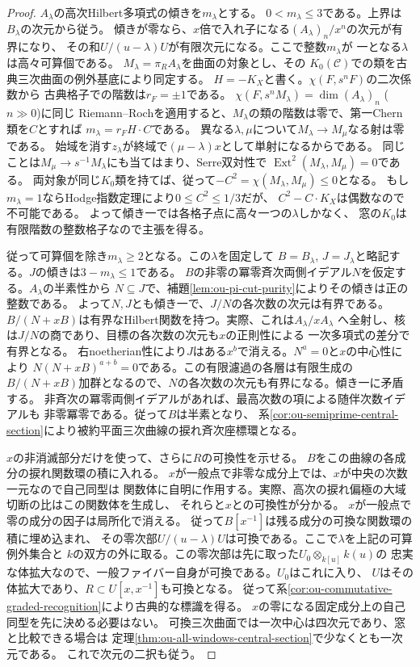 \documentclass[11pt,a4paper]{ltjsarticle}
\theoremstyle{definition}
\begin{document}
\begin{proof}
$A_\lambda$の高次Hilbert多項式の傾きを$m_\lambda$とする。
$0<m_\lambda\le3$である。上界は$B_\lambda$の次元から従う。
傾きが零なら、$x$倍で入れ子になる$(A_\lambda)_n/x^n$の次元が有界になり、
その和$U/(u-\lambda)U$が有限次元になる。ここで整数$m_\lambda$が
一となる$\lambda$は高々可算個である。
$M_\lambda=\pi_R A_\lambda$を曲面の対象とし、その
$K_0(\mathcal C)$での類を古典三次曲面の例外基底により同定する。
$H=-K_X$と書く。$\chi(F,s^nF)$の二次係数から
古典格子での階数は$r_F=\pm1$である。
$\chi(F,s^nM_\lambda)=\dim(A_\lambda)_n$ ($n\gg0$)に同じ
Riemann--Rochを適用すると、$M_\lambda$の類の階数は零で、第一Chern類を$C$とすれば
$m_\lambda=r_F H\cdot C$である。
異なる$\lambda,\mu$について$M_\lambda\to M_\mu$なる射は零である。
始域を消す$z_\lambda$が終域で$(\mu-\lambda)x$として単射になるからである。
同じことは$M_\mu\to s^{-1}M_\lambda$にも当てはまり、Serre双対性で
$\operatorname{Ext}^2(M_\lambda,M_\mu)=0$である。
両対象が同じ$K_0$類を持てば、従って$-C^2=\chi(M_\lambda,M_\mu)\le0$となる。
もし$m_\lambda=1$ならHodge指数定理により$0\le C^2\le1/3$だが、
$C^2-C\cdot K_X$は偶数なので不可能である。
よって傾き一では各格子点に高々一つの$\lambda$しかなく、
窓の$K_0$は有限階数の整数格子なので主張を得る。

従って可算個を除き$m_\lambda\ge2$となる。この$\lambda$を固定して
$B=B_\lambda$, $J=J_\lambda$と略記する。$J$の傾きは$3-m_\lambda\le1$である。
$B$の非零の冪零斉次両側イデアル$N$を仮定する。$A_\lambda$の半素性から
$N\subseteq J$で、補題\ref{lem:ou-pi-cut-purity}によりその傾きは正の整数である。
よって$N,J$とも傾き一で、$J/N$の各次数の次元は有界である。
$B/(N+xB)$は有界なHilbert関数を持つ。実際、これは$A_\lambda/xA_\lambda$
へ全射し、核は$J/N$の商であり、目標の各次数の次元も$x$の正則性による
一次多項式の差分で有界となる。
右noetherian性により$J$はある$x^b$で消える。$N^a=0$と$x$の中心性により
$N(N+xB)^{a+b}=0$である。この有限濾過の各層は有限生成の
$B/(N+xB)$加群となるので、$N$の各次数の次元も有界になる。傾き一に矛盾する。
非斉次の冪零両側イデアルがあれば、最高次数の項による随伴次数イデアルも
非零冪零である。従って$B$は半素となり、
系\ref{cor:ou-semiprime-central-section}により被約平面三次曲線の捩れ斉次座標環となる。

$x$の非消滅部分だけを使って、さらに$R$の可換性を示せる。
$B$をこの曲線の各成分の捩れ関数環の積に入れる。
$x$が一般点で非零な成分上では、$x$が中央の次数一元なので自己同型は
関数体に自明に作用する。実際、高次の捩れ偏極の大域切断の比はこの関数体を生成し、
それらと$x$との可換性が分かる。
$x$が一般点で零の成分の因子は局所化で消える。
従って$B[x^{-1}]$は残る成分の可換な関数環の積に埋め込まれ、
その零次部$U/(u-\lambda)U$は可換である。ここで$\lambda$を上記の可算例外集合と
$k$の双方の外に取る。この零次部は先に取った$U_0\otimes_{k[u]}k(u)$の
忠実な体拡大なので、一般ファイバー自身が可換である。$U_0$はこれに入り、
$U$はその体拡大であり、$R\subset U[x,x^{-1}]$も可換となる。
従って系\ref{cor:ou-commutative-graded-recognition}により古典的な標識を得る。
$x$の零になる固定成分上の自己同型を先に決める必要はない。
可換三次曲面では一次中心は四次元であり、窓と比較できる場合は
定理\ref{thm:ou-all-windows-central-section}で少なくとも一次元である。
これで次元の二択も従う。


\end{proof}
\end{document}

